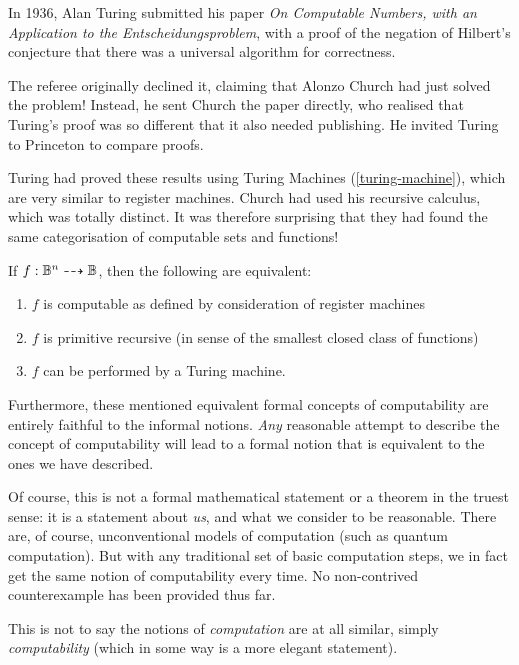 \documentclass{article}
\begin{document}
\begin{remark}
	In 1936, Alan Turing submitted his paper \textit{On Computable Numbers, with an Application to the Entscheidungsproblem}, with a proof of the negation of Hilbert's conjecture that there was a universal algorithm for correctness.
	    
	The referee originally declined it, claiming that Alonzo Church had just solved the problem! Instead, he sent Church the paper directly, who realised that Turing's proof was so different that it also needed publishing. He invited Turing to Princeton to compare proofs.
	    
	Turing had proved these results using Turing Machines (\ref{turing-machine}), which are very similar to register machines. Church had used his recursive calculus, which was totally distinct. It was therefore surprising that they had found the same categorisation of computable sets and functions!
\end{remark}

\begin{theorem}
	If $f: \mathbb{B}^{n} \dashrightarrow \mathbb{B}$, then the following are equivalent:
	\begin{enumerate}
		\item $f$ is computable as defined by consideration of register machines
		\item $f$ is primitive recursive (in sense of the smallest closed class of functions)
		\item $f$ can be performed by a Turing machine.
	\end{enumerate}
	Furthermore, these mentioned equivalent formal concepts of computability are entirely faithful to the informal notions. \textit{Any} reasonable attempt to describe the concept of computability will lead to a formal notion that is equivalent to the ones we have described.
\end{theorem}

Of course, this is not a formal mathematical statement or a theorem in the truest sense: it is a statement about \textit{us}, and what we consider to be reasonable. There are, of course, unconventional models of computation (such as quantum computation). But with any traditional set of basic computation steps, we in fact get the same notion of computability every time. No non-contrived counterexample has been provided thus far.

This is not to say the notions of \textit{computation} are at all similar, simply \textit{computability} (which in some way is a more elegant statement).
\end{document}
